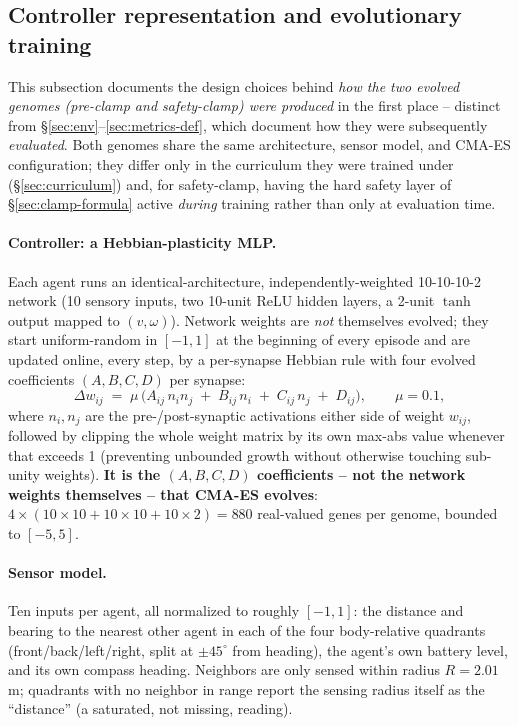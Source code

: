 \documentclass[11pt]{article}
\begin{document}
\subsection{Controller representation and evolutionary training}
\label{sec:evolution}
This subsection documents the design choices behind \emph{how the two evolved genomes
(pre-clamp and safety-clamp) were produced} in the first place -- distinct from
\S\ref{sec:env}--\ref{sec:metrics-def}, which document how they were subsequently
\emph{evaluated}. Both genomes share the same architecture, sensor model, and CMA-ES
configuration; they differ only in the curriculum they were trained under
(\S\ref{sec:curriculum}) and, for safety-clamp, having the hard safety layer of
\S\ref{sec:clamp-formula} active \emph{during} training rather than only at evaluation time.

\paragraph{Controller: a Hebbian-plasticity MLP.} Each agent runs an identical-architecture,
independently-weighted 10-10-10-2 network (10 sensory inputs, two 10-unit ReLU hidden layers,
a 2-unit $\tanh$ output mapped to $(v,\omega)$). Network weights are \emph{not} themselves
evolved; they start uniform-random in $[-1,1]$ at the beginning of every episode and are
updated online, every step, by a per-synapse Hebbian rule with four evolved coefficients
$(A,B,C,D)$ per synapse:
\begin{equation}
\Delta w_{ij} \;=\; \mu \,\big(A_{ij}\, n_i n_j \;+\; B_{ij}\, n_i \;+\; C_{ij}\, n_j \;+\; D_{ij}\big), \qquad \mu = 0.1,
\label{eq:hebbian-update}
\end{equation}
where $n_i, n_j$ are the pre-/post-synaptic activations either side of weight $w_{ij}$, followed
by clipping the whole weight matrix by its own max-abs value whenever that exceeds 1 (preventing
unbounded growth without otherwise touching sub-unity weights). \textbf{It is the $(A,B,C,D)$
coefficients -- not the network weights themselves -- that CMA-ES evolves}: $4 \times (10{\times}10 + 10{\times}10 + 10{\times}2) = 880$ real-valued genes per genome, bounded to $[-5, 5]$.

\paragraph{Sensor model.} Ten inputs per agent, all normalized to roughly $[-1,1]$: the
distance and bearing to the nearest other agent in each of the four body-relative quadrants
(front/back/left/right, split at $\pm45^\circ$ from heading), the agent's own battery level, and
its own compass heading. Neighbors are only sensed within radius $R=2.01$\,m; quadrants with no
neighbor in range report the sensing radius itself as the ``distance'' (a saturated, not
missing, reading).
\end{document}
